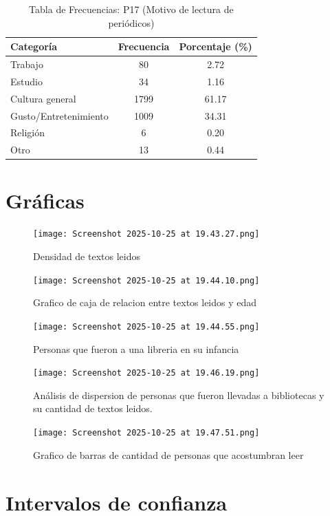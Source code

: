 \documentclass[aps,reprint]{revtex4-2}
\begin{document}
\begin{table}[h!]
\centering
\caption{Tabla de Frecuencias: P17 (Motivo de lectura de periódicos)}
\begin{tabular}{lcc}
\toprule
\textbf{Categoría} & \textbf{Frecuencia} & \textbf{Porcentaje (\%)} \\
\midrule
Trabajo & 80 & 2.72 \\
Estudio & 34 & 1.16 \\
Cultura general & 1799 & 61.17 \\
Gusto/Entretenimiento & 1009 & 34.31 \\
Religión & 6 & 0.20 \\
Otro & 13 & 0.44 \\
\bottomrule
\end{tabular}
\end{table}

\section{Gráficas}\label{graficas}

\begin{figure}[H]
  \centering
  \texttt{[image: Screenshot 2025-10-25 at 19.43.27.png]}
  \caption{Densidad de textos leidos}
\end{figure}

\begin{figure}[H]
  \centering
  \texttt{[image: Screenshot 2025-10-25 at 19.44.10.png]}
  \caption{Grafico de caja de relacion entre textos leidos y edad}
\end{figure}

\begin{figure}[H]
  \centering
  \texttt{[image: Screenshot 2025-10-25 at 19.44.55.png]}
  \caption{Personas que fueron a una libreria en su infancia}
\end{figure}

\begin{figure}[H]
  \centering
  \texttt{[image: Screenshot 2025-10-25 at 19.46.19.png]}
  \caption{Análisis de dispersion de  personas que fueron llevadas a bibliotecas y su cantidad de textos leidos.}
\end{figure}

\begin{figure}[H]
  \centering
  \texttt{[image: Screenshot 2025-10-25 at 19.47.51.png]}
  \caption{Grafico de barras de cantidad de personas que acostumbran leer}
\end{figure}

\section{Intervalos de confianza}\label{int_conf}
\end{document}
